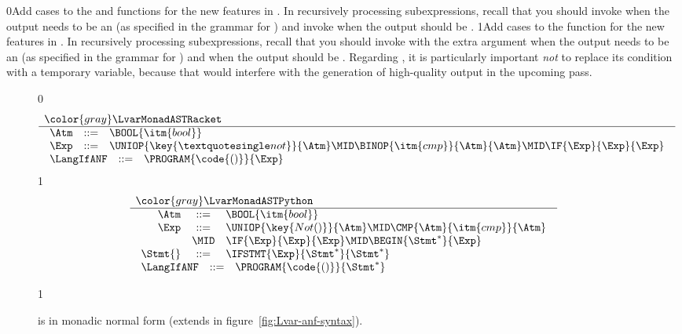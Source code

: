 \documentclass[7x10]{TimesAPriori_MIT}%
\newcommand{\gray}[1]{{\color{gray} #1}}
\def\racketEd{0}
\def\pythonEd{1}
\providecommand{\BookEdition}{1}
\let\edition\BookEdition
\newcommand{\racket}[1]{{\if\edition\racketEd{#1}\fi}}
\newcommand{\pythonColor}[0]{}
\newcommand{\python}[1]{{\if\edition\pythonEd\pythonColor #1\fi}}
\numberwithin{theorem}{chapter}
\numberwithin{definition}{chapter}
\numberwithin{equation}{chapter}
\begin{document}
\racket{Add cases to the  and 
  functions for the new features in \LangIf{}. In recursively
  processing subexpressions, recall that you should invoke
  \code{rco\_atom} when the output needs to be an \Atm{} (as specified
  in the grammar for \LangIfANF{}) and invoke  when the
  output should be \Exp{}.}
%
\python{Add cases to the \code{rco\_exp} function for the new features
  in \LangIf{}. In recursively processing subexpressions, recall that
  you should invoke \code{rco\_exp} with the extra argument
  \code{True} when the output needs to be an \Atm{} (as specified in
  the grammar for \LangIfANF{}) and \code{False} when the output
  should be \Exp{}.}
%
Regarding , it is particularly important \emph{not} to
replace its condition with a temporary variable, because that would
interfere with the generation of high-quality output in the upcoming
 pass.

\newcommand{\LifMonadASTRacket}{
\begin{array}{rcl}
\Atm &::=& \BOOL{\itm{bool}}\\
\Exp &::=& \UNIOP{\key{\textquotesingle not}}{\Atm} 
     \MID \BINOP{\itm{cmp}}{\Atm}{\Atm} 
     \MID \IF{\Exp}{\Exp}{\Exp} 
\end{array}
}
  
\newcommand{\LifMonadASTPython}{
\begin{array}{rcl}
\Atm &::=& \BOOL{\itm{bool}}\\
\Exp &::=& \UNIOP{\key{Not()}}{\Atm}
           \MID \CMP{\Atm}{\itm{cmp}}{\Atm} \\
   &\MID& \IF{\Exp}{\Exp}{\Exp} 
    \MID \BEGIN{\Stmt^{*}}{\Exp}\\
\Stmt{} &::=& \IFSTMT{\Exp}{\Stmt^{*}}{\Stmt^{*}}
\end{array}
}

\begin{figure}[tp]
\centering
\begin{tcolorbox}[colback=white]
{\if\edition\racketEd    
\[
\begin{array}{l}
  \gray{\LvarMonadASTRacket} \\ \hline
  \LifMonadASTRacket \\
\begin{array}{rcl}
\LangIfANF  &::=& \PROGRAM{\code{()}}{\Exp}
\end{array}
\end{array}
\]
\fi}
{\if\edition\pythonEd\pythonColor
\[
\begin{array}{l}
  \gray{\LvarMonadASTPython} \\ \hline
  \LifMonadASTPython \\
   \begin{array}{rcl}
     \LangIfANF  &::=& \PROGRAM{\code{()}}{\Stmt^{*}}
   \end{array}
\end{array}
\]
\fi}
\end{tcolorbox}
\python{}
\caption{\LangIfANF{} is \LangIf{} in monadic normal form
  (extends \LangVarANF in figure~\ref{fig:Lvar-anf-syntax}).}
\label{fig:Lif-anf-syntax}
\end{figure}
\end{document}
